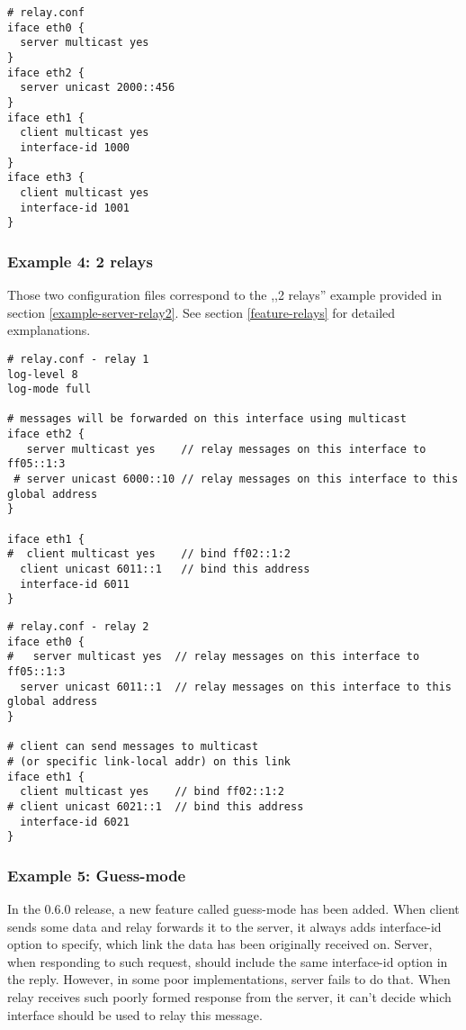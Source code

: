 \begin{lstlisting}
# relay.conf
iface eth0 {
  server multicast yes
}
iface eth2 {
  server unicast 2000::456
}
iface eth1 {
  client multicast yes
  interface-id 1000
}
iface eth3 {
  client multicast yes
  interface-id 1001
}
\end{lstlisting}

\subsubsection{Example 4: 2 relays}
\label{example-relay-cascade}
Those two configuration files correspond to the ,,2 relays'' example
provided in section \ref{example-server-relay2}. See section
\ref{feature-relays} for detailed exmplanations.

\begin{lstlisting}
# relay.conf - relay 1
log-level 8
log-mode full

# messages will be forwarded on this interface using multicast
iface eth2 {
   server multicast yes    // relay messages on this interface to ff05::1:3
 # server unicast 6000::10 // relay messages on this interface to this global address
}

iface eth1 {
#  client multicast yes    // bind ff02::1:2
  client unicast 6011::1   // bind this address
  interface-id 6011
}
\end{lstlisting}

\begin{lstlisting}
# relay.conf - relay 2
iface eth0 {
#   server multicast yes  // relay messages on this interface to ff05::1:3
  server unicast 6011::1  // relay messages on this interface to this global address
}

# client can send messages to multicast
# (or specific link-local addr) on this link
iface eth1 {
  client multicast yes    // bind ff02::1:2
# client unicast 6021::1  // bind this address
  interface-id 6021
}
\end{lstlisting}

\subsubsection{Example 5: Guess-mode}
In the 0.6.0 release, a new feature called guess-mode has been
added. When client sends some data and relay forwards it to the
server, it always adds interface-id option to specify, which link
the data has been originally received on. Server, when responding to
such request, should include the same interface-id option in the
reply. However, in some poor implementations, server fails to do
that. When relay receives such poorly formed response from the server,
it can't decide which interface should be used to relay this
message.

